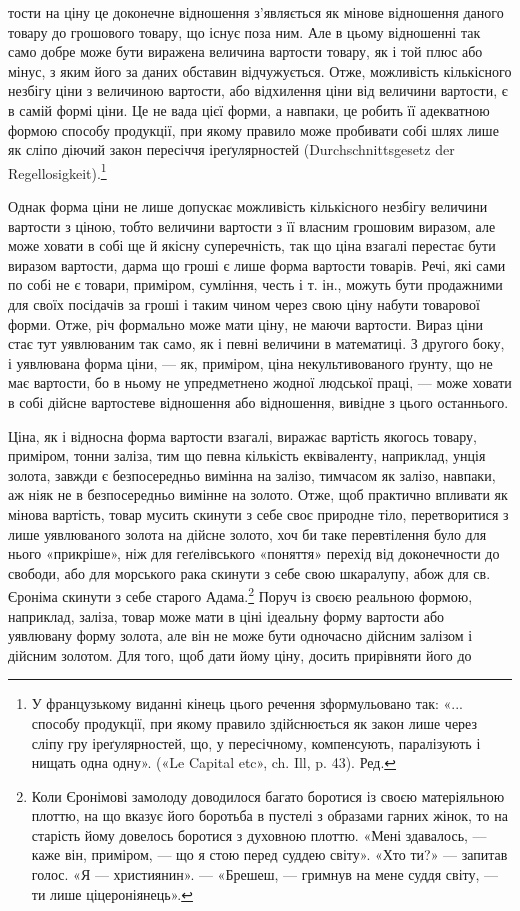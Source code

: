 тости на ціну це доконечне відношення з’являється як мінове
відношення даного товару до грошового товару, що існує поза
ним. Але в цьому відношенні так само добре може бути виражена
величина вартости товару, як і той плюс або мінус, з яким його
за даних обставин відчужується. Отже, можливість кількісного
незбігу ціни з величиною вартости, або відхилення ціни від величини
вартости, є в самій формі ціни. Це не вада цієї форми, а
навпаки, це робить її адекватною формою способу продукції,
при якому правило може пробивати собі шлях лише як сліпо
діючий закон пересіччя іреґулярностей (Durchschnittsgesetz der
Regellosigkeit).\footnote*{
У французькому виданні кінець цього речення зформульовано
так: «... способу продукції, при якому правило здійснюється як закон
лише через сліпу гру іреґулярностей, що, у пересічному, компенсують,
паралізують і нищать одна одну». («Le Capital etc», ch. Ill, p. 43). Ред.
}

Однак форма ціни не лише допускає можливість кількісного
незбігу величини вартости з ціною, тобто величини вартости
з її власним грошовим виразом, але може ховати в собі ще й
якісну суперечність, так що ціна взагалі перестає бути виразом
вартости, дарма що гроші є лише форма вартости товарів. Речі,
які сами по собі не є товари, приміром, сумління, честь і т. ін.,
можуть бути продажними для своїх посідачів за гроші і таким
чином через свою ціну набути товарової форми. Отже, річ формально
може мати ціну, не маючи вартости. Вираз ціни стає тут
уявлюваним так само, як і певні величини в математиці. З другого
боку, і уявлювана форма ціни, — як, приміром, ціна некультивованого
ґрунту, що не має вартости, бо в ньому не упредметнено
жодної людської праці, — може ховати в собі дійсне вартостеве
відношення або відношення, вивідне з цього останнього.

Ціна, як і відносна форма вартости взагалі, виражає вартість
якогось товару, приміром, тонни заліза, тим що певна кількість
еквіваленту, наприклад, унція золота, завжди є безпосередньо
вимінна на залізо, тимчасом як залізо, навпаки, аж ніяк не в
безпосередньо вимінне на золото. Отже, щоб практично впливати
як мінова вартість, товар мусить скинути з себе своє природне
тіло, перетворитися з лише уявлюваного золота на дійсне
золото, хоч би таке перевтілення було для нього «прикріше»,
ніж для геґелівського «поняття» перехід від доконечности до
свободи, або для морського рака скинути з себе свою шкаралупу,
абож для св. Єроніма скинути з себе старого Адама.\footnote{
Коли Єронімові замолоду доводилося багато боротися із своєю
матеріяльною плоттю, на що вказує його боротьба в пустелі з образами
гарних жінок, то на старість йому довелось боротися з духовною плоттю.
«Мені здавалось, — каже він, приміром, — що я стою перед суддею світу».
«Хто ти?» — запитав голос. «Я — християнин». — «Брешеш, — гримнув
на мене суддя світу, — ти лише ціцероніянець».
} Поруч
із своєю реальною формою, наприклад, заліза, товар може мати
в ціні ідеальну форму вартости або уявлювану форму золота,
але він не може бути одночасно дійсним залізом і дійсним золотом.
Для того, щоб дати йому ціну, досить прирівняти його до
